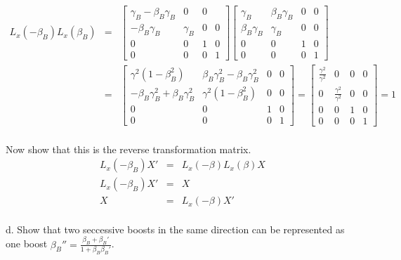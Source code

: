 \documentclass[11pt]{amsart}
\begin{document}
\begin{eqnarray*} 
L_{x}(-\beta_{B})L_{x}(\beta_{B}) &=& \begin{bmatrix}
	\gamma_{B} -\beta_{B}\gamma_{B} & 0 & 0 \\
	-\beta_{B}\gamma_{B} & \gamma_{B} & 0 & 0 \\
	0 & 0 & 1 & 0 \\
	0 & 0 & 0 & 1 
	\end{bmatrix}\begin{bmatrix}
	\gamma_{B} & \beta_{B}\gamma_{B} & 0 & 0 \\
	\beta_{B}\gamma_{B} & \gamma_{B} & 0 & 0 \\
	0 & 0 & 1 & 0 \\
	0 & 0 & 0 & 1
	\end{bmatrix} \\
	&=& \begin{bmatrix}
	\gamma^{2}(1-\beta_{B}^{2}) & \beta_{B}\gamma_{B}^{2}-\beta_{B}\gamma_{B}^{2} & 0 & 0 \\
	-\beta_{B}\gamma_{B}^{2}+\beta_{B}\gamma_{B}^{2} & \gamma^{2}(1-\beta_{B}^{2}) & 0 & 0 \\
	0 & 0 & 1 & 0 \\
	0 & 0 & 0 & 1 
	\end{bmatrix} = \begin{bmatrix}
	\frac{\gamma^{2}}{\gamma^{2}} & 0 & 0 & 0 \\
	0 & \frac{\gamma^{2}}{\gamma^{2}} & 0 & 0 \\
	0 & 0 & 1 & 0 \\
	0 & 0 & 0 & 1 
	\end{bmatrix} = 1
\end{eqnarray*} \\
Now show that this is the reverse transformation matrix. \\
\begin{eqnarray*}
L_{x}(-\beta_{B})X' &=& L_{x}(-\beta)L_{x}(\beta)X \\
L_{x}(-\beta_{B})X'  &=& X \\
X &=& L_{x}(-\beta)X' 
\end{eqnarray*} \\
d. Show that two seccessive boosts in the same direction can be represented as one boost $\beta_{B}''=\frac{\beta_{B}+\beta_{B}'}{1+\beta_{B}\beta_{B}'}$. \\
\end{document}
